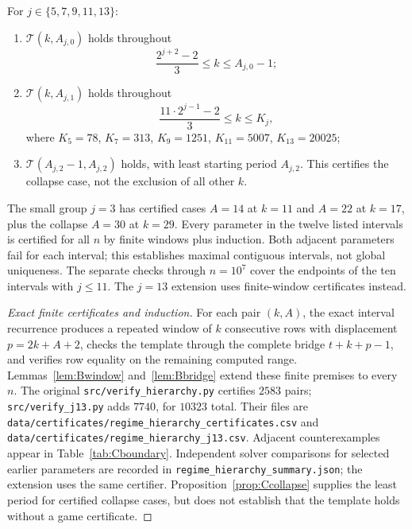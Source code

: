 \begin{theorem}\label{thm:Chierarchy}
For $j\in\{5,7,9,11,13\}$:
\begin{enumerate}\itemsep0.2em
\item $\mathcal{T}(k,A_{j,0})$ holds throughout
\[
\frac{2^{j+2}-2}{3}\le k\le A_{j,0}-1;
\]
\item $\mathcal{T}(k,A_{j,1})$ holds throughout
\[
\frac{11\cdot2^{j-1}-2}{3}\le k\le K_j,
\]
where $K_5=78$, $K_7=313$, $K_9=1251$, $K_{11}=5007$, $K_{13}=20025$;
\item $\mathcal{T}(A_{j,2}-1,A_{j,2})$ holds, with least starting period $A_{j,2}$. This certifies the collapse case, not the exclusion of all other $k$.
\end{enumerate}
The small group $j=3$ has certified cases $A=14$ at $k=11$ and $A=22$ at $k=17$, plus the collapse $A=30$ at $k=29$. Every parameter in the twelve listed intervals is certified for all $n$ by finite windows plus induction. Both adjacent parameters fail for each interval; this establishes maximal contiguous intervals, not global uniqueness. The separate checks through $n=10^7$ cover the endpoints of the ten intervals with $j\le11$. The $j=13$ extension uses finite-window certificates instead.
\end{theorem}
\begin{proof}[Exact finite certificates and induction]
For each pair $(k,A)$, the exact interval recurrence produces a repeated window of $k$ consecutive rows with displacement $p=2k+A+2$, checks the template through the complete bridge $t+k+p-1$, and verifies row equality on the remaining computed range. Lemmas~\ref{lem:Bwindow} and~\ref{lem:Bbridge} extend these finite premises to every $n$. The original \texttt{src/verify\_hierarchy.py} certifies $2583$ pairs; \texttt{src/verify\_j13.py} adds $7740$, for $10323$ total. Their files are \texttt{data/certificates/regime\_hierarchy\_certificates.csv} and \texttt{data/certificates/regime\_hierarchy\_j13.csv}. Adjacent counterexamples appear in Table~\ref{tab:Cboundary}. Independent solver comparisons for selected earlier parameters are recorded in \texttt{regime\_hierarchy\_summary.json}; the extension uses the same certifier. Proposition~\ref{prop:Ccollapse} supplies the least period for certified collapse cases, but does not establish that the template holds without a game certificate.
\end{proof}

